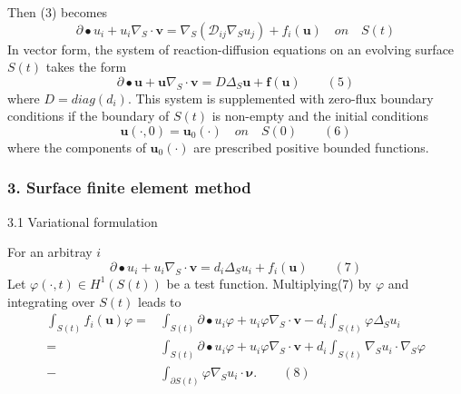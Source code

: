 \documentclass[notheorems,serif]{beamer}
\begin{document}
\begin{frame}
Then (3) becomes
\begin{equation*}
\partial\bullet u_i+u_i\nabla_S\cdot\boldsymbol{v}=\nabla_S(\mathcal{D}_{ij}\nabla_Su_j)+f_i(\boldsymbol{u})\quad on\quad S(t)
\end{equation*}
In vector form, the system of reaction-diffusion equations on an evolving surface $S(t)$ takes the form
\begin{equation*}
\partial\bullet\boldsymbol{u}+\boldsymbol{u}\nabla_S\cdot\boldsymbol{v}=D\Delta_S\boldsymbol{u}+\boldsymbol{f}(\boldsymbol{u})\qquad(5)
\end{equation*}
where $D=diag(d_i)$. This system is supplemented with zero-flux boundary conditions if the boundary of $S(t)$ is non-empty and the initial conditions
\begin{equation*}
\boldsymbol{u}(\cdot, 0)=\boldsymbol{u}_0(\cdot)\quad on\quad S(0)\qquad(6)
\end{equation*}
where the components of $\boldsymbol{u}_0(\cdot)$ are prescribed positive bounded functions.
\end{frame}

\begin{frame}
\frametitle{\small 3. Surface finite element method}
3.1 Variational formulation

For an arbitray $i$ 
\begin{equation*}
\partial\bullet u_i+u_i\nabla_S\cdot\boldsymbol{v}=d_i\Delta_Su_i+f_i(\boldsymbol{u})\qquad(7)
\end{equation*}
Let $\varphi(\cdot, t)\in H^1(S(t))$ be a test function. Multiplying(7) by $\varphi$ and integrating over $S(t)$ leads to 
\begin{equation*}
\begin{aligned}
\int_{S(t)}f_i(\boldsymbol{u})\varphi=&\int_{S(t)}\partial\bullet u_i\varphi+u_i\varphi\nabla_S\cdot\boldsymbol{v}-d_i\int_{S(t)}\varphi\Delta_Su_i\\
=&\int_{S(t)}\partial\bullet u_i\varphi+u_i\varphi\nabla_S\cdot\boldsymbol{v}+d_i\int_{S(t)}\nabla_Su_i\cdot\nabla_S\varphi\\
-&\int_{\partial S(t)}\varphi\nabla_Su_i\cdot\boldsymbol{\nu}.\qquad(8)
\end{aligned}
\end{equation*}
\end{frame}
\end{document}
